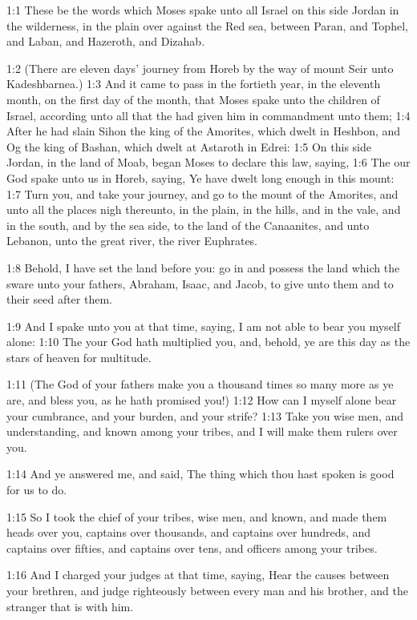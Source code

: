 

1:1 These be the words which Moses spake unto all Israel on this side Jordan in the wilderness, in the plain over against the Red sea, between Paran, and Tophel, and Laban, and Hazeroth, and Dizahab.

1:2 (There are eleven days' journey from Horeb by the way of mount Seir unto Kadeshbarnea.)  1:3 And it came to pass in the fortieth year, in the eleventh month, on the first day of the month, that Moses spake unto the children of Israel, according unto all that the \LORD had given him in commandment unto them; 1:4 After he had slain Sihon the king of the Amorites, which dwelt in Heshbon, and Og the king of Bashan, which dwelt at Astaroth in Edrei: 1:5 On this side Jordan, in the land of Moab, began Moses to declare this law, saying, 1:6 The \LORD our God spake unto us in Horeb, saying, Ye have dwelt long enough in this mount: 1:7 Turn you, and take your journey, and go to the mount of the Amorites, and unto all the places nigh thereunto, in the plain, in the hills, and in the vale, and in the south, and by the sea side, to the land of the Canaanites, and unto Lebanon, unto the great river, the river Euphrates.

1:8 Behold, I have set the land before you: go in and possess the land which the \LORD sware unto your fathers, Abraham, Isaac, and Jacob, to give unto them and to their seed after them.

1:9 And I spake unto you at that time, saying, I am not able to bear you myself alone: 1:10 The \LORD your God hath multiplied you, and, behold, ye are this day as the stars of heaven for multitude.

1:11 (The \LORD God of your fathers make you a thousand times so many more as ye are, and bless you, as he hath promised you!)  1:12 How can I myself alone bear your cumbrance, and your burden, and your strife?  1:13 Take you wise men, and understanding, and known among your tribes, and I will make them rulers over you.

1:14 And ye answered me, and said, The thing which thou hast spoken is good for us to do.

1:15 So I took the chief of your tribes, wise men, and known, and made them heads over you, captains over thousands, and captains over hundreds, and captains over fifties, and captains over tens, and officers among your tribes.

1:16 And I charged your judges at that time, saying, Hear the causes between your brethren, and judge righteously between every man and his brother, and the stranger that is with him.

